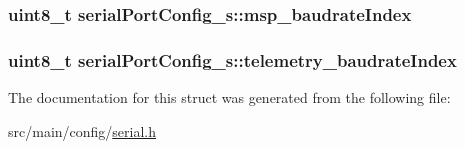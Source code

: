 \hypertarget{structserialPortConfig__s_ad904e0230d906d2b7371f036e43e887f}{
\subsubsection[{msp\+\_\+baudrate\+Index}]{\setlength{\rightskip}{0pt plus 5cm}uint8\+\_\+t serial\+Port\+Config\+\_\+s\+::msp\+\_\+baudrate\+Index}}\label{structserialPortConfig__s_ad904e0230d906d2b7371f036e43e887f}
\hypertarget{structserialPortConfig__s_a923fd7b551abb5a75968b5fa03074386}{
\subsubsection[{telemetry\+\_\+baudrate\+Index}]{\setlength{\rightskip}{0pt plus 5cm}uint8\+\_\+t serial\+Port\+Config\+\_\+s\+::telemetry\+\_\+baudrate\+Index}}\label{structserialPortConfig__s_a923fd7b551abb5a75968b5fa03074386}


The documentation for this struct was generated from the following file\+:\begin{DoxyCompactItemize}
\item 
src/main/config/\hyperlink{config_2serial_8h}{serial.\+h}\end{DoxyCompactItemize}
